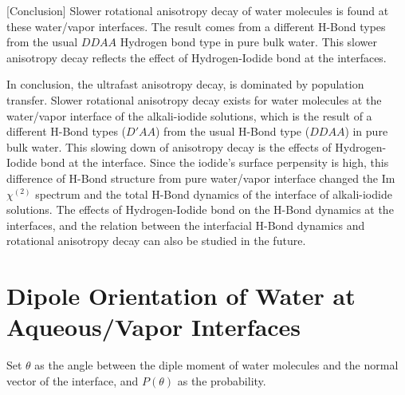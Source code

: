 [Conclusion]
Slower rotational anisotropy decay of water molecules is found at these water/vapor interfaces. The result comes from a different H-Bond types from the usual $DDAA$ Hydrogen bond type in pure bulk water.%
This slower anisotropy decay reflects the effect of Hydrogen-Iodide bond at the interfaces.

In conclusion, the ultrafast anisotropy decay, is dominated by population transfer.
Slower rotational anisotropy decay exists for water molecules  at the water/vapor interface of the alkali-iodide solutions, which is the result of a different H-Bond types ($D'AA$) from the usual H-Bond type ($DDAA$) in pure bulk water. This slowing down of anisotropy decay is the effects of Hydrogen-Iodide bond at the interface. Since the iodide's surface perpensity is high, this difference of H-Bond structure from pure water/vapor interface changed the Im$\chi^{(2)}$ spectrum and the total H-Bond dynamics of the interface of alkali-iodide solutions.  The effects of Hydrogen-Iodide bond on the H-Bond dynamics at the interfaces, and the relation between the interfacial H-Bond dynamics and rotational anisotropy decay can also be studied in the future.


\section{Dipole Orientation of Water at Aqueous/Vapor Interfaces}
Set $\theta$ as the angle between the diple moment of water molecules and the normal vector 
of the interface, and $P(\theta)$ as the probability.

